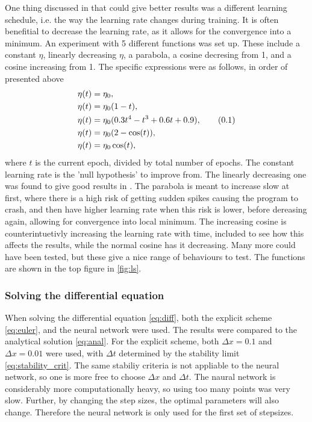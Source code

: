 \documentclass[multicolumn, 10pt]{extarticle}
\newcommand\numberthis{\addtocounter{equation}{1}\tag{\theequation}}
\begin{document}
One thing discussed in \cite{p2HO} that could give better results was a different learning schedule, i.e. the way the learning rate changes during training. It is often benefitial to decrease the learning rate, as it allows for the convergence into a minimum. An experiment with 5 different functions was set up. These include a constant $\eta$, linearly decreasing $\eta$, a parabola, a cosine decresing from 1, and a cosine increasing from 1.
The specific expressions were as follows, in order of presented above
\begin{align*}\label{eq:ls}
	\eta(t) & = \eta_0,
	\\
	\eta(t) & = \eta_0 (1 - t),
	\\
	\eta(t) & = \eta_0 (0.3t^4-t^3+0.6t+0.9), \numberthis
	\\
	\eta(t) & = \eta_0 (2 - \cos(t)),
	\\
	\eta(t) & = \eta_0 \cos(t),
\end{align*}
where $t$ is the current epoch, divided by total number of epochs. The constant learning rate is the 'null hypothesis' to improve from. The linearly decreasing one was found to give good results in \cite{p2HO}. The parabola is meant to increase slow at first, where there is a high risk of getting sudden spikes causing the program to crash, and then have higher learning rate when this risk is lower, before dereasing again, allowing for convergence into local minimum. The increasing cosine is counterintuetivly increasing the learning rate with time, included to see how this affects the results, while the normal cosine has it decreasing. Many more could have been tested, but these give a nice range of behaviours to test. The functions are shown in the top figure in \ref{fig:ls}.

\subsubsection{Solving the differential equation}
When solving the differential equation \eqref{eq:diff}, both the explicit scheme \eqref{eq:euler}, and the neural network were used. The results were compared to the analytical solution \eqref{eq:anal}. For the explicit scheme, both $\Delta x=0.1$ and $\Delta x=0.01$ were used, with $\Delta t$ determined by the stability limit \eqref{eq:stability_crit}. The same stabiliy criteria is not appliable to the neural network, so one is more free to choose $\Delta x$ and $\Delta t$. The naural network is considerably more computationally heavy, so using too many points was very slow. Further, by changing the step sizes, the optimal parameters will also change. Therefore the neural network is only used for the first set of stepsizes.
\end{document}
